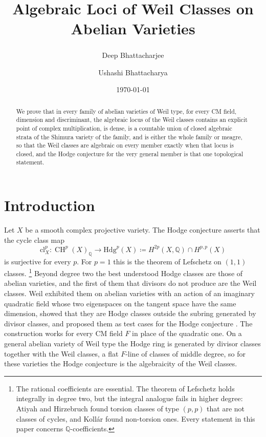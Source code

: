 \documentclass[11pt,reqno]{amsart}
\title[Algebraic loci of Weil classes]
      {Algebraic Loci of Weil Classes on Abelian Varieties}
\author{Deep Bhattacharjee\textsuperscript{\dag}}
\author{Ushashi Bhattacharya}
\date{\today}
\theoremstyle{plain}
\theoremstyle{definition}
\theoremstyle{remark}
\newcommand{\QQ}{\mathbb{Q}}
\newcommand{\Hdg}{\mathrm{Hdg}}
\newcommand{\cl}{\mathrm{cl}}
\DeclareMathOperator{\CH}{CH}
\begin{document}
\begin{abstract}
We prove that in every family of abelian varieties of Weil type, for every
CM field, dimension and discriminant, the algebraic locus of the Weil
classes contains an explicit point of complex multiplication, is dense, is a
countable union of closed algebraic strata of the Shimura variety of the
family, and is either the whole family or meagre, so that the Weil classes
are algebraic on every member exactly when that locus is closed, and the
Hodge conjecture for the very general member is that one topological
statement.
\end{abstract}

\maketitle

\setcounter{tocdepth}{1}
\begingroup
\setlength{\parskip}{0pt}
\tableofcontents
\endgroup

\section{Introduction}\label{sec:intro}


Let $X$ be a smooth complex projective variety. The Hodge conjecture asserts
that the cycle class map
\[
  \cl^{p}_{X}\colon \CH^{p}(X)_{\QQ}\longrightarrow \Hdg^{p}(X)
  \coloneqq H^{2p}(X,\QQ)\cap H^{p,p}(X)
\]
is surjective for every $p$. For $p=1$ this is the theorem of Lefschetz on
$(1,1)$ classes.%
\footnote{The rational coefficients are essential. The theorem of Lefschetz
holds integrally in degree two, but the integral analogue fails in higher
degree: Atiyah and Hirzebruch found torsion classes of type $(p,p)$ that are
not classes of cycles, and Koll\'ar found non-torsion ones. Every statement in
this paper concerns $\QQ$-coefficients.}
Beyond degree two the best understood Hodge classes are those of abelian
varieties, and the first of them that divisors do not produce are the Weil
classes. Weil exhibited them on abelian varieties with an action of an
imaginary quadratic field whose two eigenspaces on the tangent space have the
same dimension, showed that they are Hodge classes outside the subring
generated by divisor classes, and proposed them as test cases for the Hodge
conjecture \cite{Weil77}. The construction works for every CM field $F$ in
place of the quadratic one. On a general abelian variety of Weil type the
Hodge ring is generated by divisor classes together with the Weil classes, a
flat $F$-line of classes of middle degree, so for these varieties the Hodge
conjecture is the algebraicity of the Weil classes.
\end{document}
